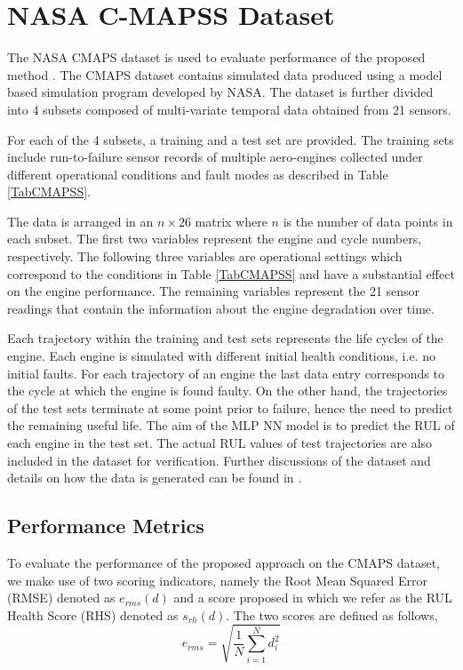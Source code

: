 \documentclass[preprint,12pt]{elsarticle}%
\begin{document}
\section{NASA C-MAPSS Dataset}

\label{sec:rul_dataset}

The NASA CMAPS dataset is used to evaluate performance of the proposed method
\cite{CMAPS2008}. The CMAPS dataset contains simulated data produced using a
model based simulation program developed by NASA. The dataset is further
divided into 4 subsets composed of multi-variate temporal data obtained from
21 sensors.

For each of the 4 subsets, a training and a test set are provided. The training
sets include run-to-failure sensor records of multiple aero-engines collected
under different operational conditions and fault modes as described in Table
\ref{TabCMAPSS}.

The data is arranged in an $n\times26$ matrix where $n$ is the number of data
points in each subset. The first two variables represent the engine and cycle
numbers, respectively. The following three variables are operational settings
which correspond to the conditions in Table \ref{TabCMAPSS} and have a
substantial effect on the engine performance. The remaining variables
represent the 21 sensor readings that contain the information about the engine
degradation over time.

Each trajectory within the training and test sets represents the life cycles
of the engine. Each engine is simulated with different initial health
conditions, i.e. no initial faults. For each trajectory of an engine the last
data entry corresponds to the cycle at which the engine is found faulty. On
the other hand, the trajectories of the test sets terminate at some point
prior to failure, hence the need to predict the remaining useful life. The aim
of the MLP NN model is to predict the RUL of each engine in the test set. The
actual RUL values of test trajectories are also included in the dataset for
verification. Further discussions of the dataset and details on how the data
is generated can be found in \cite{Saxena2008}.

\subsection{Performance Metrics}

\label{sec:rul_metrics}

To evaluate the performance of the proposed approach on the CMAPS dataset, we
make use of two scoring indicators, namely the Root Mean Squared Error (RMSE)
denoted as $e_{rms}(d)$ and a score proposed in \cite{Saxena2008} which we
refer as the RUL Health Score (RHS) denoted as $s_{rh}(d)$. The two scores are
defined as follows,
\begin{equation}
e_{rms} = \sqrt{ \frac{1}{N} \sum_{i=1}^{N}{d_{i}^{2}}} \label{eq:rmse}%
\end{equation}
%
\end{document}
